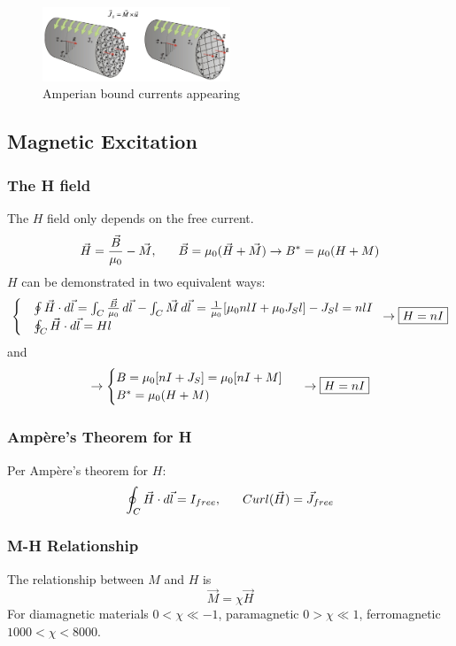 \documentclass[a4paper]{article}
\begin{document}
\begin{figure}[h]
    \centering
    \includegraphics[width=0.5\textwidth]{IMG/js.png}
    \caption{Amperian bound currents appearing}
    \label{fig:js}
\end{figure}

\subsection{Magnetic Excitation}
\subsubsection{The H field}
The $H$ field only depends on the free current.
$$
\vec{H}=\frac{\vec{B}}{\mu_{0}}-\vec{M}, \hspace{4ex}\vec{B}=\mu_{0}(\vec{H}+\vec{M})\to B^*=\mu_{0} (H+M)
$$
$H$ can be demonstrated in two equivalent ways:
$$
\begin{cases}
&\oint \vec{H}\cdot d\vec{l}=\int_{C} \frac{\vec{B}}{\mu_{0}} \, d\vec{l}\,-\int_{C}^{} \vec{M} \, d\vec{l}\, = \frac{1}{\mu_{0}}[\mu_{0}nlI+\mu_{0}J_{S}l]-J_{S}l=nlI \\
&\oint_{C} \vec{H}\cdot d\vec{l}=Hl
\end{cases} \hspace{1ex}\to \boxed{H=nI}
$$
and
$$
\to\begin{cases}
B=\mu_{0}[nI+J_{S}]=\mu_{0}[nI+M] \\
B^*=\mu_{0}(H+M)
\end{cases}\hspace{1ex}\to \boxed{H=nI}
$$

\subsubsection{Ampère's Theorem for H}
Per Ampère's theorem for $H$:
$$
\oint_{C}\vec{H}\cdot d\vec{l}=I_{f r e e}, \hspace{4ex}Curl(\vec{H})=\vec{J}_{f r e e}
$$

\subsubsection{M-H Relationship}
The relationship between $M$ and $H$ is
$$
\vec{M}=\chi \vec{H}
$$
For diamagnetic materials $0<\chi\ll-1$, paramagnetic $0>\chi\ll 1$, ferromagnetic $1000<\chi<8000$.
\end{document}
